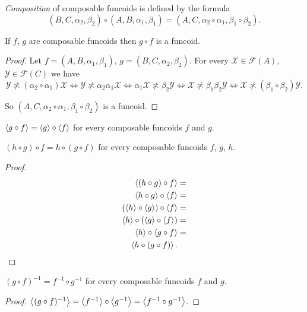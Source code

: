 \begin{defn}
\emph{Composition}
of composable funcoids is defined by the formula
\[
(B,C,\alpha_{2},\beta_{2})\circ(A,B,\alpha_{1},\beta_{1})=(A,C,\alpha_{2}
\circ\alpha_{1},\beta_{1}\circ\beta_{2}).
\]
\end{defn}
\begin{prop}
If $f$, $g$ are composable funcoids then $g\circ f$ is a funcoid.\end{prop}
\begin{proof}
Let $f=(A,B,\alpha_{1},\beta_{1})$, $g=(B,C,\alpha_{2},\beta_{2})$.
For every $\mathcal{X}\in\mathscr{F}(A)$, $\mathcal{Y}\in\mathscr{F}(C)$
we have
\[
\mathcal{Y}\nasymp(\alpha_{2}\circ\alpha_{1})\mathcal{X}\Leftrightarrow\mathcal{
Y}\nasymp\alpha_{2}\alpha_{1}\mathcal{X}\Leftrightarrow\alpha_{1}\mathcal{X}
\nasymp\beta_{2}\mathcal{Y}\Leftrightarrow\mathcal{X}\nasymp\beta_{1}\beta_{2}
\mathcal{Y}\Leftrightarrow\mathcal{X}\nasymp(\beta_{1}\circ\beta_{2})\mathcal{Y}
.
\]


So $(A,C,\alpha_{2}\circ\alpha_{1},\beta_{1}\circ\beta_{2})$ is a
funcoid.\end{proof}
\begin{obvious}
$\left\langle g\circ f\right\rangle=\left\langle g\right\rangle\circ\left\langle f\right\rangle$ for every composable
funcoids $f$ and $g$.\end{obvious}
\begin{prop}
$(h\circ g)\circ f=h\circ(g\circ f)$ for every composable funcoids
$f$, $g$, $h$.\end{prop}
\begin{proof}
~
\begin{align*}
\left\langle (h\circ g)\circ f\right\rangle & =\\
\left\langle h\circ g\right\rangle\circ\left\langle f\right\rangle & =\\
(\left\langle h\right\rangle\circ\left\langle g\right\rangle)\circ\left\langle f\right\rangle & =\\
\left\langle h\right\rangle\circ(\left\langle g\right\rangle\circ\left\langle f\right\rangle) & =\\
\left\langle h\right\rangle\circ\left\langle g\circ f\right\rangle & =\\
\left\langle h\circ(g\circ f)\right\rangle.
\end{align*}
\end{proof}
\begin{thm}
$(g\circ f)^{-1}=f^{-1}\circ g^{-1}$ for every composable funcoids
$f$ and $g$.\end{thm}
\begin{proof}
$\left\langle (g\circ
f)^{-1}\right\rangle=\left\langle f^{-1}\right\rangle\circ\left\langle g^{-1}\right\rangle=\left\langle f^{-1}\circ g^{-1}\right\rangle$.
\end{proof}

